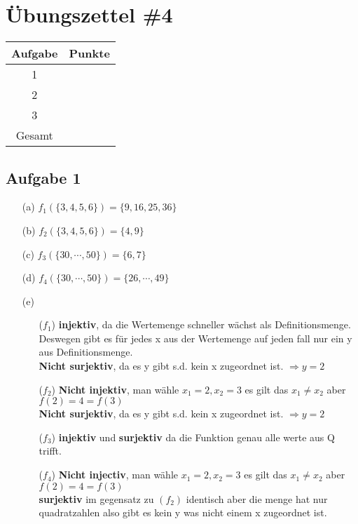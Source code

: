 \documentclass{article}
\begin{document}
\section*{Übungszettel \#4} %

\begin{center}
    \begin{tabular}{|c|c|}
        \hline
        Aufgabe & Punkte \\
        \hline
        1 & \\
        2 & \\
        3 & \\
        \hline
        Gesamt & \\
        \hline
    \end{tabular}
\end{center}

\subsection*{Aufgabe 1}
    \begin{itemize}
        \item [(a)] \(f_1(\{3, 4, 5, 6\}) = \{9, 16, 25, 36\}\)
        \item [(b)] \(f_2(\{3, 4, 5, 6\}) = \{4, 9\}\)
        \item [(c)] \(f_3(\{30, \cdots, 50\}) = \{6, 7\}\)
        \item [(d)] \(f_4(\{30, \cdots, 50\}) = \{26, \cdots, 49\}\)
        \item [(e)] \begin{itemize}
            \item [(\(f_1\))] \textbf{injektiv}, da die Wertemenge schneller wächst als Definitionsmenge. Deswegen gibt es für jedes x aus der Wertemenge auf jeden fall nur ein y aus Definitionsmenge.\\ \textbf{Nicht surjektiv}, da es y gibt s.d. kein x zugeordnet ist. \(\Rightarrow y = 2 \) 
            \item [(\(f_2\))] \textbf{Nicht injektiv}, man wähle \(x_1 = 2, x_2 = 3\) es gilt das \(x_1 \not = x_2\) aber \(f(2) = 4 = f(3)\) \\ \textbf{Nicht surjektiv}, da es y gibt s.d. kein x zugeordnet ist. \(\Rightarrow y = 2 \)
            \item [(\(f_3\))] \textbf{injektiv} und \textbf{surjektiv} da die Funktion genau alle werte aus Q trifft. 
            \item [(\(f_4\))] \textbf{Nicht injectiv}, man wähle \(x_1 = 2, x_2 = 3\) es gilt das \(x_1 \not = x_2\) aber \(f(2) = 4 = f(3)\) \\ \textbf{surjektiv} im gegensatz zu \((f_2)\) identisch aber die menge hat nur quadratzahlen also gibt es kein y was nicht einem x zugeordnet ist.
        \end{itemize}
    \end{itemize}
\end{document}
